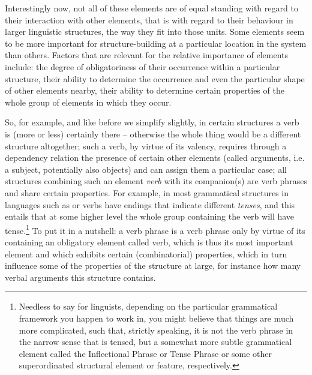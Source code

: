 \documentclass[output=paper
  ,nobabel
  ,draftmode
  ,colorlinks, citecolor=brown
]{langscibook}
\begin{document}
Interestingly now, not all of these elements are of equal standing with regard to their interaction
with other elements, that is with regard to their behaviour in larger linguistic structures, the way
they fit into those units. Some elements seem to be more important for structure-building at a
particular location in the system than others. Factors that are relevant for the relative importance
of elements include: the degree of obligatoriness of their occurrence within a particular structure,
their ability to determine the occurrence and even the particular shape of other elements nearby,
their ability to determine certain properties of the whole group of elements in which they occur.

So, for example, and like before we simplify slightly, in certain structures a verb is (more or
less) certainly there – otherwise the whole thing would be a different structure altogether; such a
verb, by virtue of its valency, requires through a dependency relation the presence of certain other
elements (called arguments, i.e. a subject, potentially also objects) and can assign them a
particular case; all structures combining such an element \emph{verb} with its companion(s) are
verb phrases and share certain properties. For example, in most grammatical structures in languages
such as  or  verbs have endings that indicate different \emph{tenses}, and this
entails that at some higher level the whole group containing the verb will have
tense.\footnote{Needless to say for linguists, depending on the particular grammatical framework you
  happen to work in, you might believe that things are much more complicated, such that, strictly
  speaking, it is not the verb phrase in the narrow sense that is tensed, but a somewhat more subtle
  grammatical element called the Inflectional Phrase or Tense Phrase or some other superordinated
  structural element or feature, respectively.}  To put it in a nutshell: a verb phrase is a verb
phrase only by virtue of its containing an obligatory element called verb, which is thus its most
important element and which exhibits certain (combinatorial) properties, which in turn influence
some of the properties of the structure at large, for instance how many verbal arguments this
structure contains.
\end{document}
